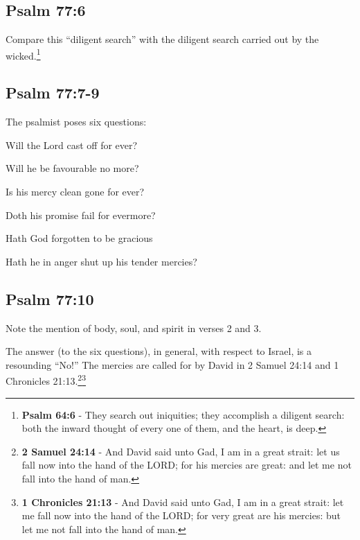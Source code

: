 \subsection{Psalm 77:6}
Compare this ``diligent search'' with the diligent search carried out by the wicked.\footnote{\textbf{Psalm 64:6} - They search out iniquities; they accomplish a diligent search: both the inward thought of every one of them, and the heart, is deep. }

\subsection{Psalm 77:7-9}
The psalmist poses six questions:
\begin{compactenum}
    \item Will the Lord cast off for ever?
    \item Will he be favourable no more?
    \item Is his mercy clean gone for ever?
    \item Doth his promise fail for evermore?
    \item Hath God forgotten to be gracious 
    \item Hath he in anger shut up his tender mercies?\\
\end{compactenum}

\subsection{Psalm 77:10}
Note the mention of body, soul, and spirit in verses 2 and 3.


\noindent The answer (to the six questions), in general, with respect to Israel, is a resounding ``No!'' The mercies are called for by David in 2 Samuel 24:14 and 1 Chronicles 21:13.\footnote{\textbf{2 Samuel 24:14} - And David said unto Gad, I am in a great strait: let us fall now into the hand of the LORD; for his mercies are great: and let me not fall into the hand of man.}\footnote{\textbf{1 Chronicles 21:13} - And David said unto Gad, I am in a great strait: let me fall now into the hand of the LORD; for very great are his mercies: but let me not fall into the hand of man.}\cite{Ruckman1992PsalmsV2}

